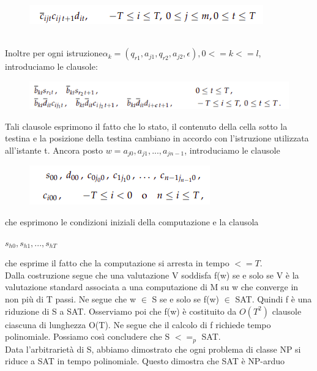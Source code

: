\begin{figure}[htp]
    \centering
    \includegraphics[scale=0.6]{tesi_stile/img/levin7.png}
\end{figure}
\\Inoltre per ogni istruzione$ \alpha_k =(q_{r1}, a_{j1}, q_{r2}, a_{j2}, \epsilon), 0 <= k <= l$, introduciamo le clausole:
\begin{figure}[htp]
    \centering
    \includegraphics[scale=0.6]{tesi_stile/img/levin8.png}
\end{figure}
Tali clausole esprimono il fatto che lo stato, il contenuto della cella sotto la testina e la
posizione della testina cambiano in accordo con l’istruzione utilizzata all’istante t.
Ancora posto $w = a_{j0},a_{j1},...,a_{jn-1}$, introduciamo le clausole
\begin{figure}[htp]
    \centering
    \includegraphics[scale=0.6]{tesi_stile/img/levin9.png}
\end{figure}
che esprimono le condizioni iniziali della computazione e la clausola
\begin{center}
    $s_{h0},s_{h1},...,s_{hT}$
\end{center}
che esprime il fatto che la computazione si arresta in tempo $<= T$.
\\Dalla costruzione segue che una valutazione V soddisfa f(w) se e solo se V è la valutazione standard associata a una computazione di M su w che converge in non più di T passi. Ne segue che w $\in$ S se e solo se f(w) $\in$ SAT. Quindi f è una riduzione di S a SAT. Osserviamo poi che f(w) è costituito da $O(T^2)$ clausole ciascuna di lunghezza
O(T). Ne segue che il calcolo di f richiede tempo polinomiale. Possiamo così concludere che S $<=_p$ SAT.
\\Data l’arbitrarietà di S, abbiamo dimostrato che ogni problema di classe NP si riduce a SAT in tempo polinomiale. Questo dimostra che SAT è NP-arduo











